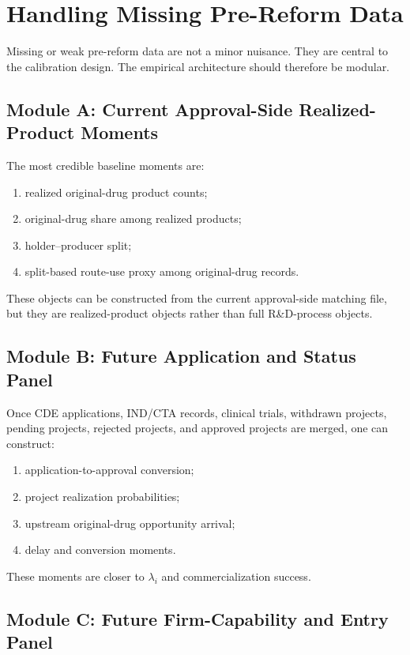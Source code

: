 \documentclass[12pt]{article}
\newcommand{\1}{\mathbf{1}}
\begin{document}
\section{Handling Missing Pre-Reform Data}

Missing or weak pre-reform data are not a minor nuisance. They are central to the calibration design. The empirical architecture should therefore be modular.

\subsection{Module A: Current Approval-Side Realized-Product Moments}

The most credible baseline moments are:
\begin{enumerate}[leftmargin=2em]
    \item realized original-drug product counts;
    \item original-drug share among realized products;
    \item holder--producer split;
    \item split-based route-use proxy among original-drug records.
\end{enumerate}
These objects can be constructed from the current approval-side matching file, but they are realized-product objects rather than full R\&D-process objects.

\subsection{Module B: Future Application and Status Panel}

Once CDE applications, IND/CTA records, clinical trials, withdrawn projects, pending projects, rejected projects, and approved projects are merged, one can construct:
\begin{enumerate}[leftmargin=2em]
    \item application-to-approval conversion;
    \item project realization probabilities;
    \item upstream original-drug opportunity arrival;
    \item delay and conversion moments.
\end{enumerate}
These moments are closer to $\lambda_i$ and commercialization success.

\subsection{Module C: Future Firm-Capability and Entry Panel}
\end{document}
